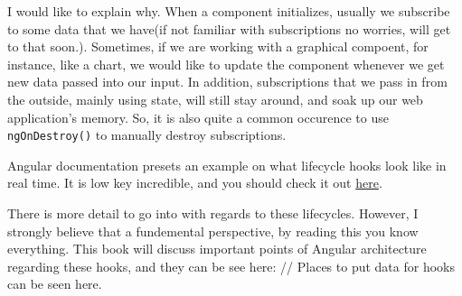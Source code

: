 I would like to explain why. When a component initializes, usually we subscribe
to some data that we have(if not familiar with subscriptions no worries, will
get to that soon.). Sometimes, if we are working with a graphical compoent, for
instance, like a chart, we would like to update the component whenever we get
new data passed into our input. In addition, subscriptions that we pass in from
the outside, mainly using state, will still stay around, and soak up our web
application's memory. So, it is also quite a common occurence to use \lstinline{ngOnDestroy()}
to manually destroy subscriptions.

Angular documentation presets an example on what lifecycle hooks look like
in real time. It is low key incredible, and you should check it out
\href{https://stackblitz.com/angular/lpdbkmkrryv}{here}.

There is more detail to go into with regards to these lifecycles. However, I
strongly believe that a fundemental perspective, by reading this you know
everything. This book will discuss important points of Angular architecture
regarding these hooks, and they can be see here:
// Places to put data for hooks can be seen here.
